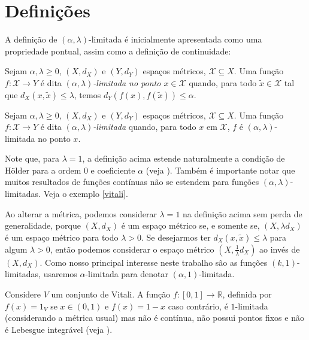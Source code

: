 \section{Definições}
\vspace{1cm}
A definição de $(\alpha,\lambda)$-limitada é inicialmente apresentada como uma propriedade pontual, assim como a definição de continuidade:
\begin{definition}
  Sejam $\alpha, \lambda \ge 0$, $(X, d_X)$ e $(Y, d_Y)$ espaços métricos, $\mathcal{X} \subseteq X$. Uma função $f : \mathcal{X} \to Y$ é dita \textit{$(\alpha,\lambda)$-limitada no ponto $x \in \mathcal{X}$} quando, para todo $\tilde{x} \in \mathcal{X}$ tal que $d_X(x, \tilde{x}) \le \lambda$, temos $d_Y(f(x), f(\tilde{x})) \le \alpha$.
\end{definition}


\vspace{1cm}

\begin{definition}
  Sejam $\alpha, \lambda \ge 0$, $(X, d_X)$ e $(Y, d_Y)$ espaços métricos, $\mathcal{X} \subseteq X$. Uma função $f : \mathcal{X} \to Y$ é dita \textit{$(\alpha,\lambda)$-limitada} quando, para todo $x$ em $\mathcal{X}$, $f$ é $(\alpha,\lambda)$-limitada no ponto $x$.
\end{definition}

Note que, para $\lambda = 1$, a definição acima estende naturalmente a condição de Hölder para a ordem $0$ e coeficiente $\alpha$ (veja \cite{holder}). Também é importante notar que muitos resultados de funções contínuas não se estendem para funções $(\alpha, \lambda)$-limitadas. Veja o exemplo \ref{vitali}.

Ao alterar a métrica, podemos considerar $\lambda = 1$ na definição acima sem perda de generalidade, porque $(X, d_X)$ é um espaço métrico se, e somente se, $(X, \lambda d_X)$ é um espaço métrico para todo $\lambda > 0$. Se desejarmos ter $d_X(x, \tilde{x}) \le \lambda$ para algum $\lambda > 0$, então podemos considerar o espaço métrico $(X, \frac{1}{\lambda} d_X)$ ao invés de $(X, d_X)$. Como nosso principal interesse neste trabalho são as funções $(k,1)$-limitadas, usaremos $\alpha$-limitada para denotar $(\alpha,1)$-limitada.

\begin{example} \label{vitali}
  Considere $V$ um conjunto de Vitali. A função $f : [0, 1] \to \mathbb{R}$, definida por $f(x) = 1_V$ se $x \in (0, 1)$ e $f(x) = 1 - x$ caso contrário, é $1$-limitada (considerando a métrica usual) mas não é contínua, não possui pontos fixos e não é Lebesgue integrável (veja \cite{vitali}).
\end{example}

